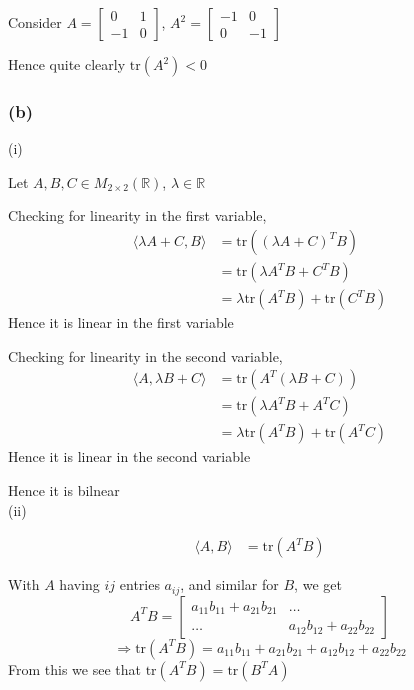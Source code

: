 \documentclass{article}
\begin{document}
Consider \(A = \begin{bmatrix}
    0 & 1 \\
    -1 & 0  
\end{bmatrix}\), \(A^2 = \begin{bmatrix}
    -1 & 0 \\
    0 & -1 
\end{bmatrix}\)

Hence quite clearly \(\mathrm{tr}(A^2) < 0\)





\subsubsection*{(b)}
(i)

Let \(A,B,C \in M_{2\times 2}(\mathbb{R})\), \(\lambda \in \mathbb{R}\)

Checking for linearity in the first variable, 
\begin{align*}
    \langle \lambda A + C , B\rangle &= \mathrm{tr}((\lambda A + C)^T B) \\
    &= \mathrm{tr}(\lambda A^TB + C^T B) \\
    &= \lambda \mathrm{tr}(A^T B) + \mathrm{tr}(C^TB)
\end{align*}
Hence it is linear in the first variable

Checking for linearity in the second variable, 
\begin{align*}
    \langle  A , \lambda B + C\rangle &= \mathrm{tr}(A^T(\lambda B + C)) \\
    &= \mathrm{tr}(\lambda A^TB + A^TC) \\
    &= \lambda \mathrm{tr}(A^TB) + \mathrm{tr}(A^TC)
\end{align*}
Hence it is linear in the second variable

Hence it is bilnear
\\

(ii)

\begin{align*}
    \langle A,B \rangle &= \mathrm{tr}(A^TB)
\end{align*}

With \(A\) having \(ij\) entries \(a_{ij}\), and similar for \(B\), we get 
\[
A^T B = \begin{bmatrix}
    a_{11}b_{11} + a_{21}b_{21} & \dots \\
    \dots & a_{12}b_{12} + a_{22}b_{22}
\end{bmatrix}
\]
\[
\Rightarrow \mathrm{tr}(A^TB) = a_{11}b_{11} + a_{21}b_{21} + a_{12}b_{12} + a_{22}b_{22}
\]
From this we see that \(\mathrm{tr}(A^TB) = \mathrm{tr}(B^TA)\)
\end{document}
